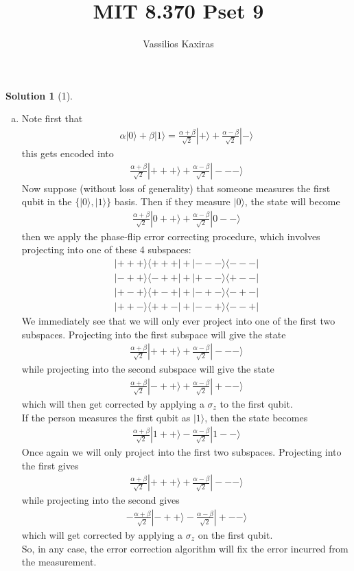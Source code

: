 \documentclass[11pt]{article}
\author{Vassilios Kaxiras}
\title{MIT 8.370 Pset 9}
\theoremstyle{definition}
\newtheorem*{solution}{Solution}
\newcommand{\eq}{\begin{equation}\begin{aligned}}
\newcommand{\qe}{\end{aligned}\end{equation}}
\newcommand{\bra}[1]{\langle #1|}
\newcommand{\ket}[1]{|#1\rangle}
\begin{document}
\maketitle

\begin{solution}[1]
  \begin{enumerate}[(a)]
    \item Note first that
    \eq
      \alpha\ket{0}+\beta\ket{1}=\frac{\alpha+\beta}{\sqrt{2}}\ket{+}+\frac{\alpha-\beta}{\sqrt{2}}\ket{-}
    \qe
    this gets encoded into
    \eq
      \frac{\alpha+\beta}{\sqrt{2}}\ket{+++}+\frac{\alpha-\beta}{\sqrt{2}}\ket{---}
    \qe
    Now suppose (without loss of generality) that someone measures the first qubit in the $\{\ket{0},\ket{1}\}$ basis. Then if they measure $\ket{0}$, the state will become
    \eq
      \frac{\alpha+\beta}{\sqrt{2}}\ket{0++}+\frac{\alpha-\beta}{\sqrt{2}}\ket{0--}
    \qe
    then we apply the phase-flip error correcting procedure, which involves projecting into one of these 4 subspaces:
    \eq
      \ket{+++}\bra{+++}+\ket{---}\bra{---}\\
      \ket{-++}\bra{-++}+\ket{+--}\bra{+--}\\
      \ket{+-+}\bra{+-+}+\ket{-+-}\bra{-+-}\\
      \ket{++-}\bra{++-}+\ket{--+}\bra{--+}
    \qe
    We immediately see that we will only ever project into one of the first two subspaces. Projecting into the first subspace will give the state
    \eq
      \frac{\alpha+\beta}{\sqrt{2}}\ket{+++}+\frac{\alpha-\beta}{\sqrt{2}}\ket{---}
    \qe
    while projecting into the second subspace will give the state
    \eq
      \frac{\alpha+\beta}{\sqrt{2}}\ket{-++}+\frac{\alpha-\beta}{\sqrt{2}}\ket{+--}
    \qe
    which will then get corrected by applying a $\sigma_z$ to the first qubit. \\
    If the person measures the first qubit as $\ket{1}$, then the state becomes
    \eq
      \frac{\alpha+\beta}{\sqrt{2}}\ket{1++}-\frac{\alpha-\beta}{\sqrt{2}}\ket{1--}
    \qe
    Once again we will only project into the first two subspaces. Projecting into the first gives
    \eq
      \frac{\alpha+\beta}{\sqrt{2}}\ket{+++}+\frac{\alpha-\beta}{\sqrt{2}}\ket{---}
    \qe
    while projecting into the second gives
    \eq
      -\frac{\alpha+\beta}{\sqrt{2}}\ket{-++}-\frac{\alpha-\beta}{\sqrt{2}}\ket{+--}
    \qe
    which will get corrected by applying a $\sigma_z$ on the first qubit.\\
    So, in any case, the error correction algorithm will fix the error incurred from the measurement.

\end{enumerate}
\end{solution}
\end{document}
